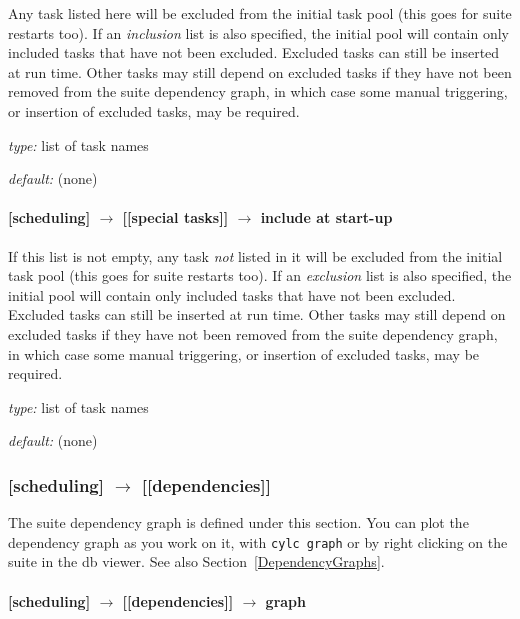 Any task listed here will be excluded from the initial task pool (this
goes for suite restarts too). If an {\em inclusion} list is also
specified, the initial pool will contain only included tasks that have
not been excluded. Excluded tasks can still be inserted at run time.
Other tasks may still depend on excluded tasks if they have not been
removed from the suite dependency graph, in which case some manual
triggering, or insertion of excluded tasks, may be required.

\begin{myitemize}
    \item {\em type:} list of task names
    \item {\em default:} (none)
\end{myitemize}

\paragraph[include at start-up]{[scheduling] $\rightarrow$ [[special tasks]] $\rightarrow$ include at start-up}
\label{IASU}

If this list is not empty, any task {\em not} listed in it will be
excluded from the initial task pool (this goes for suite restarts too).
If an {\em exclusion} list is also specified, the initial pool will
contain only included tasks that have not been excluded. Excluded tasks
can still be inserted at run time. Other tasks may still depend on
excluded tasks if they have not been removed from the suite dependency
graph, in which case some manual triggering, or insertion of excluded 
tasks, may be required.

\begin{myitemize}
    \item {\em type:} list of task names
    \item {\em default:} (none)
\end{myitemize}

\subsubsection[{[[}dependencies{]]}]{[scheduling] $\rightarrow$ [[dependencies]]}

The suite dependency graph is defined under this section.  You can plot
the dependency graph as you work on it, with \lstinline=cylc graph= or
by right clicking on the suite in the db viewer.  See also 
Section~\ref{DependencyGraphs}.

\paragraph[graph]{ [scheduling] $\rightarrow$ [[dependencies]] $\rightarrow$ graph }

